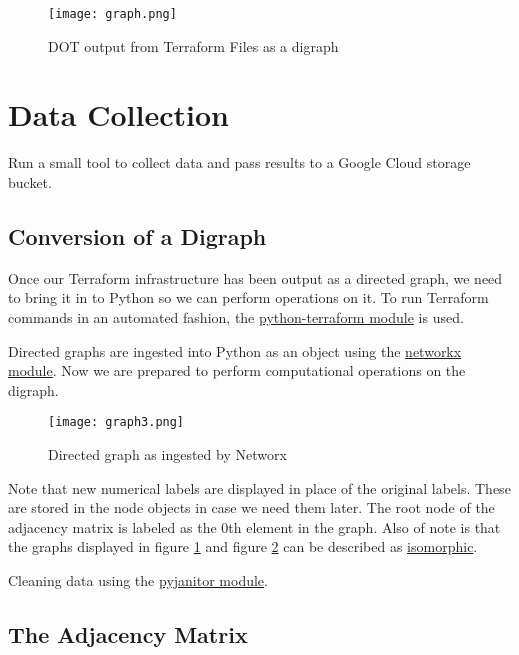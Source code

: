 \justifying
\begin{figure}[H]
	\texttt{[image: graph.png]}
	\caption{DOT output from Terraform Files as a digraph}
	\label{pygraph}
\end{figure}

\section{\label{sec:collection}Data Collection}

\justifying
Run a small tool to collect data and pass results to a Google Cloud storage bucket.

\subsection{\label{sec:conversion}Conversion of a Digraph}

\justifying
Once our Terraform infrastructure has been output as a directed graph, we need to bring it in to Python so we can
perform operations on it. To run Terraform commands in an automated fashion, 
the \href{https://pypi.org/project/python-terraform/}{python-terraform module} is used.
\vspace{2mm}

\justifying
Directed graphs are ingested into Python as an object using the \href{https://pypi.org/project/networkx/}{networkx module}. Now we are prepared
to perform computational operations on the digraph.
\vspace{2mm}

\justifying
\begin{figure}[H]
    \texttt{[image: graph3.png]}
    \caption{Directed graph as ingested by Networx}
    \label{digraph}
\end{figure}

\justifying
Note that new numerical labels are displayed in place of the original labels. These are
stored in the node objects in case we need them later. The root node of the adjacency matrix is labeled
as the 0th element in the graph. Also of note is that the graphs displayed in figure \ref{pygraph} and figure \ref{digraph} can be described as \href{https://en.wikipedia.org/wiki/Graph\_isomorphism}{isomorphic}.
\vspace{2mm}

\justifying
Cleaning data using the \href{}{pyjanitor module}.
\vspace{2mm}

\subsection{\label{sec:adjacency}The Adjacency Matrix}

